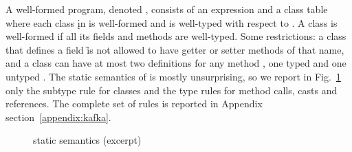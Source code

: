 \documentclass[acmlarge, anonymous, authordraft]{acmart}
\begin{document}



 A well-formed program, denoted \WFp\e\K, consists of an expression \e and a
class table \K where each class \k in \K is well-formed and \e is well-typed
with respect to \K.  A class is well-formed if all its fields and methods
are well-typed. Some restrictions: a class that defines a field \f is not allowed to have
getter or setter methods of that name, and a class can have at most two
definitions for any method \m, one typed \Mdef\m\x\C\D\e and one untyped
\Mdef\m\x\any\any\e.  The static semantics of \kafka is mostly unsurprising,
so we report in Fig.~\ref{f:staticsem} only the subtype rule for classes and the type rules for method calls, casts and references.
The complete
set of rules is reported in Appendix section~\ref{appendix:kafka}.  


\begin{figure}[!t]
\hrulefill

{\small
\begin{mathpar}








\end{mathpar}}
\hrulefill
\caption{\kafka static semantics (excerpt)}\label{f:staticsem}
\end{figure}
\end{document}
